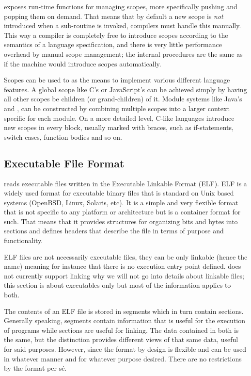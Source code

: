 \thename{} exposes run-time functions for managing scopes, more specifically
pushing and popping them on demand. That means that by default a new scope is
\emph{not} introduced when a sub-routine is invoked, compilers must handle this
manually. This way a compiler is completely free to introduce scopes according
to the semantics of a language specification, and there is very little
performance overhead by manual scope management; the internal procedures are the
same as if the machine would introduce scopes automatically.

Scopes can be used to as the means to implement various different language
features. A global scope like C's or JavaScript's can be achieved simply by
having all other scopes be children (or grand-children) of it. Module systems
like Java's  and , can be constructed by combining
multiple scopes into a larger context specific for each module. On a more
detailed level, C-like languages introduce new scopes in every block, usually
marked with braces, such as if-statements, switch cases, function bodies and so
on.

\subsection{Executable File Format}

\thename{} reads executable files written in the Executable Linkable Format
(ELF). ELF is a widely used format for executable binary files that is standard
on Unix based systems (OpenBSD, Linux, Solaris, etc\cite{NEEDED}). It is a
simple and very flexible format that is not specific to any platform or
architecture but is a container format for such. That means that it provides
structures for organizing bits and bytes into sections and defines headers that
describe the file in terms of purpose and functionality.

ELF files are not necessarily executable files, they can be only linkable (hence
the name) meaning for instance that there is no execution entry point
defined. \thename{} does not currently support linking why we will not go into
details about linkable files; this section is about executables only but most of
the information applies to both.

The contents of an ELF file is stored in segments which in turn contain
sections. Generally speaking, segments contain information that is useful for
the execution of programs while sections are useful for linking. The data
contained in both is the same, but the distinction provides different views of
that same data, useful for said purposes\cite{elf-spec}. However, since the
format by design is flexible and can be used in whatever manner and for whatever
purpose desired. There are no restrictions by the format per s\'e.

